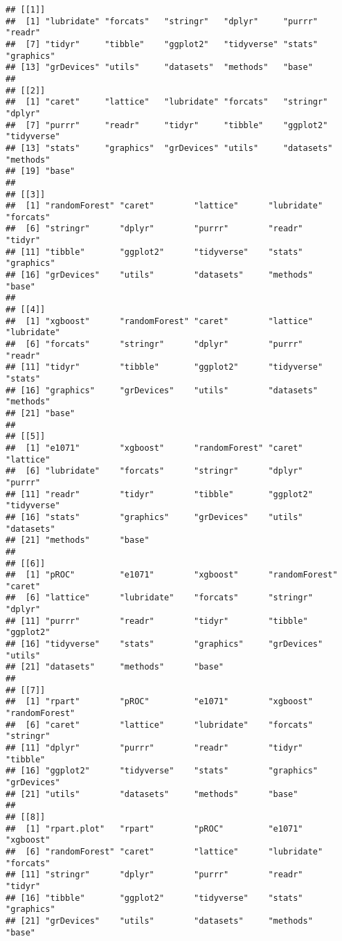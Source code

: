 \documentclass[
]{article}
\begin{document}
\begin{verbatim}
## [[1]]
##  [1] "lubridate" "forcats"   "stringr"   "dplyr"     "purrr"     "readr"    
##  [7] "tidyr"     "tibble"    "ggplot2"   "tidyverse" "stats"     "graphics" 
## [13] "grDevices" "utils"     "datasets"  "methods"   "base"     
## 
## [[2]]
##  [1] "caret"     "lattice"   "lubridate" "forcats"   "stringr"   "dplyr"    
##  [7] "purrr"     "readr"     "tidyr"     "tibble"    "ggplot2"   "tidyverse"
## [13] "stats"     "graphics"  "grDevices" "utils"     "datasets"  "methods"  
## [19] "base"     
## 
## [[3]]
##  [1] "randomForest" "caret"        "lattice"      "lubridate"    "forcats"     
##  [6] "stringr"      "dplyr"        "purrr"        "readr"        "tidyr"       
## [11] "tibble"       "ggplot2"      "tidyverse"    "stats"        "graphics"    
## [16] "grDevices"    "utils"        "datasets"     "methods"      "base"        
## 
## [[4]]
##  [1] "xgboost"      "randomForest" "caret"        "lattice"      "lubridate"   
##  [6] "forcats"      "stringr"      "dplyr"        "purrr"        "readr"       
## [11] "tidyr"        "tibble"       "ggplot2"      "tidyverse"    "stats"       
## [16] "graphics"     "grDevices"    "utils"        "datasets"     "methods"     
## [21] "base"        
## 
## [[5]]
##  [1] "e1071"        "xgboost"      "randomForest" "caret"        "lattice"     
##  [6] "lubridate"    "forcats"      "stringr"      "dplyr"        "purrr"       
## [11] "readr"        "tidyr"        "tibble"       "ggplot2"      "tidyverse"   
## [16] "stats"        "graphics"     "grDevices"    "utils"        "datasets"    
## [21] "methods"      "base"        
## 
## [[6]]
##  [1] "pROC"         "e1071"        "xgboost"      "randomForest" "caret"       
##  [6] "lattice"      "lubridate"    "forcats"      "stringr"      "dplyr"       
## [11] "purrr"        "readr"        "tidyr"        "tibble"       "ggplot2"     
## [16] "tidyverse"    "stats"        "graphics"     "grDevices"    "utils"       
## [21] "datasets"     "methods"      "base"        
## 
## [[7]]
##  [1] "rpart"        "pROC"         "e1071"        "xgboost"      "randomForest"
##  [6] "caret"        "lattice"      "lubridate"    "forcats"      "stringr"     
## [11] "dplyr"        "purrr"        "readr"        "tidyr"        "tibble"      
## [16] "ggplot2"      "tidyverse"    "stats"        "graphics"     "grDevices"   
## [21] "utils"        "datasets"     "methods"      "base"        
## 
## [[8]]
##  [1] "rpart.plot"   "rpart"        "pROC"         "e1071"        "xgboost"     
##  [6] "randomForest" "caret"        "lattice"      "lubridate"    "forcats"     
## [11] "stringr"      "dplyr"        "purrr"        "readr"        "tidyr"       
## [16] "tibble"       "ggplot2"      "tidyverse"    "stats"        "graphics"    
## [21] "grDevices"    "utils"        "datasets"     "methods"      "base"
\end{verbatim}
\end{document}
